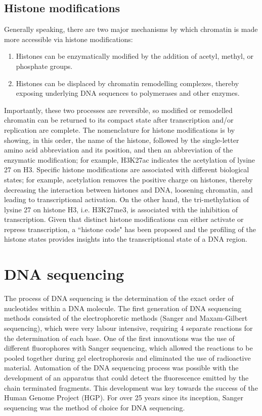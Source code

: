\subsection{Histone modifications}

Generally speaking, there are two major mechanisms by which chromatin is made more accessible via histone modifications:

\begin{enumerate}
   \item Histones can be enzymatically modified by the addition of acetyl, methyl, or phosphate groups.
   \item Histones can be displaced by chromatin remodelling complexes, thereby exposing underlying DNA sequences to polymerases and other enzymes.
\end{enumerate}

Importantly, these two processes are reversible, so modified or remodelled chromatin can be returned to its compact state after transcription and/or replication are complete. The nomenclature for histone modifications is by showing, in this order, the name of the histone, followed by the single-letter amino acid abbreviation and its position, and then an abbreviation of the enzymatic modification; for example, H3K27ac indicates the acetylation of lysine 27 on H3. Specific histone modifications are associated with different biological states; for example, acetylation removes the positive charge on histones, thereby decreasing the interaction between histones and DNA, loosening chromatin, and leading to transcriptional activation. On the other hand, the tri-methylation of lysine 27 on histone H3, i.e. H3K27me3, is associated with the inhibition of transcription\cite{pmid21652639}. Given that distinct histone modifications can either activate or repress transcription, a ``histone code" has been proposed\cite{pmid11498575} and the profiling of the histone states provides insights into the transcriptional state of a DNA region.

\section{DNA sequencing}

The process of DNA sequencing is the determination of the exact order of nucleotides within a DNA molecule. The first generation of DNA sequencing methods consisted of the electrophoretic methods (Sanger and Maxam-Gilbert sequencing), which were very labour intensive, requiring 4 separate reactions for the determination of each base. One of the first innovations was the use of different fluorophores with Sanger sequencing, which allowed the reactions to be pooled together during gel electrophoresis and eliminated the use of radioactive material. Automation of the DNA sequencing process was possible with the development of an apparatus that could detect the fluorescence emitted by the chain terminated fragments. This development was key towards the success of the Human Genome Project (HGP). For over 25 years since its inception, Sanger sequencing was the method of choice for DNA sequencing.

